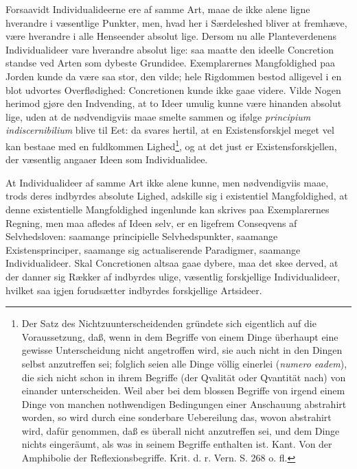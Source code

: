 \documentclass[12pt,a4paper]{book}
\begin{document}
Forsaavidt Individualideerne ere af samme Art, maae de ikke alene ligne
hverandre i væsentlige Punkter, men, hvad her i Særdeleshed bliver at fremhæve,
være hverandre i alle Henseender absolut lige. Dersom nu alle Planteverdenens
Individualideer vare hverandre absolut lige: saa maatte den ideelle Concretion
standse ved Arten som dybeste Grundidee. Exemplarernes Mangfoldighed paa Jorden
kunde da være saa stor, den vilde; hele Rigdommen bestod alligevel i en blot
udvortes Overflødighed: Concretionen kunde ikke gaae videre. Vilde Nogen herimod
gjøre den Indvending, at to Ideer umulig kunne være hinanden absolut lige, uden
at de nødvendigviis maae smelte sammen og ifølge \textit{principium
indiscernibilium} blive til Eet: da svares hertil, at en Existensforskjel meget
vel kan bestaae med en fuldkommen Lighed\footnote{Der Satz des
Nichtzuunterscheidenden gründete sich eigentlich auf die Voraussetzung, daß,
wenn in dem Begriffe von einem Dinge überhaupt eine gewisse Unterscheidung nicht
angetroffen wird, sie auch nicht in den Dingen selbst anzutreffen sei; folglich
seien alle Dinge völlig einerlei (\textit{numero eadem}), die sich nicht schon
in ihrem Begriffe (der Qvalität oder Qvantität nach) von einander unterscheiden.
Weil aber bei dem blossen Begriffe von irgend einem Dinge von manchen
nothwendigen Bedingungen einer Anschauung abstrahirt worden, so wird durch eine
sonderbare Uebereilung das, wovon abstrahirt wird, dafür genommen, daß es
überall nicht anzutreffen sei, und dem Dinge nichts eingeräumt, als was in
seinem Begriffe enthalten ist. Kant. Von der Amphibolie der Reflexionsbegriffe.
Krit. d. r. Vern. S. 268 o. fl.},
og at det just er Existensforskjellen, der væsentlig angaaer Ideen som
Individualidee.

At Individualideer af samme Art ikke alene kunne, men nødvendigviis maae, trods
deres indbyrdes absolute Lighed, adskille sig i existentiel Mangfoldighed, at
denne existentielle Mangfoldighed ingenlunde kan skrives paa Exemplarernes
Regning, men maa afledes af Ideen selv, er en ligefrem Conseqvens af
Selvhedsloven: saamange principielle Selvhedspunkter, saamange
Existensprinciper, saamange sig actualiserende Paradigmer, saamange
Individualideer. Skal Concretionen altsaa gaae dybere, maa det skee derved, at
der danner sig Rækker af indbyrdes ulige, væsentlig forskjellige
Individualideer, hvilket saa igjen forudsætter indbyrdes forskjellige Artsideer.
\end{document}
